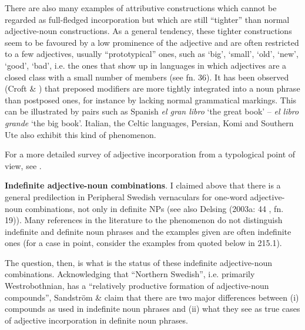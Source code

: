 \begin{styleBodytextC}
There are also many examples of attributive constructions which cannot be regarded as full-fledged incorporation but which are still “tighter” than normal adjective-noun constructions. As a general tendency, these tighter constructions seem to be favoured by a low prominence of the adjective and are often restricted to a few adjectives, usually “prototypical” ones, such as ‘big’, ‘small’, ‘old’, ‘new’, ‘good’, ‘bad’, i.e. the ones that show up in languages in which adjectives are a closed class with a small number of members (see fn. 36). It has been observed (Croft \& \citet{Deligianni2001}) that preposed modifiers are more tightly integrated into a noun phrase than postposed ones, for instance by lacking normal grammatical markings. This can be illustrated by pairs such as Spanish \textit{el gran libro }‘the great book’ – \textit{el libro grande} ‘the big book’. Italian, the Celtic languages, Persian, Komi and Southern Ute also exhibit this kind of phenomenon. 

\end{styleBodytextC}

\begin{styleBodytextC}
For a more detailed survey of adjective incorporation from a typological point of view, see \citet[225-236]{Dahl2004}.

\end{styleBodytextC}

\begin{styleBodytextC}
\textbf{Indefinite adjective-noun combinations}. I claimed above that there is a general predilection in Peripheral Swedish vernaculars for one-word adjective-noun combinations, not only in definite NPs (see also Delsing (2003a: 44 , fn. 19)). Many references in the literature to the phenomenon do not distinguish indefinite and definite noun phrases and the examples given are often indefinite ones (for a case in point, consider the examples from \citet{Hedblom1978} quoted below in 215.1). 

\end{styleBodytextC}

\begin{styleBodytextC}
The question, then, is what is the status of these indefinite adjective-noun combinations. Acknowledging that “Northern Swedish”, i.e. primarily Westrobothnian, has a “relatively productive formation of adjective-noun compounds”, Sandström \& \citet[91]{Holmberg2003} claim that there are two major differences between (i) compounds as used in indefinite noun phrases and (ii) what they see as true cases of adjective incorporation in definite noun phrases.

\end{styleBodytextC}

